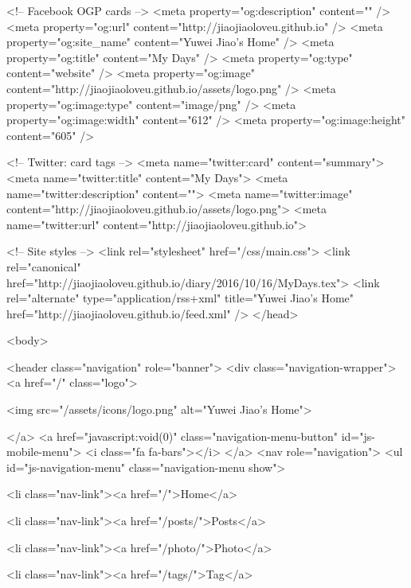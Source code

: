   
  <!-- Facebook OGP cards -->
  <meta property="og:description" content="" />
  <meta property="og:url" content="http://jiaojiaoloveu.github.io" />
  <meta property="og:site_name" content="Yuwei Jiao's Home" />
  <meta property="og:title" content="My Days" />
  <meta property="og:type" content="website" />
  <meta property="og:image" content="http://jiaojiaoloveu.github.io/assets/logo.png" />
  <meta property="og:image:type" content="image/png" />
  <meta property="og:image:width" content="612" />
  <meta property="og:image:height" content="605" />
  

  
  <!-- Twitter: card tags -->
  <meta name="twitter:card" content="summary">
  <meta name="twitter:title" content="My Days">
  <meta name="twitter:description" content="">
  <meta name="twitter:image" content="http://jiaojiaoloveu.github.io/assets/logo.png">
  <meta name="twitter:url" content="http://jiaojiaoloveu.github.io">
  

  

  <!-- Site styles -->
  <link rel="stylesheet" href="/css/main.css">
  <link rel="canonical" href="http://jiaojiaoloveu.github.io/diary/2016/10/16/MyDays.tex">
  <link rel="alternate" type="application/rss+xml" title="Yuwei Jiao's Home" href="http://jiaojiaoloveu.github.io/feed.xml" />
</head>


  <body>

    <header class="navigation" role="banner">
  <div class="navigation-wrapper">
    <a href="/" class="logo">
      
      <img src="/assets/icons/logo.png" alt="Yuwei Jiao's Home">
      
    </a>
    <a href="javascript:void(0)" class="navigation-menu-button" id="js-mobile-menu">
      <i class="fa fa-bars"></i>
    </a>
    <nav role="navigation">
      <ul id="js-navigation-menu" class="navigation-menu show">
        
          
          <li class="nav-link"><a href="/">Home</a>
          
        
          
          <li class="nav-link"><a href="/posts/">Posts</a>
          
        
          
          <li class="nav-link"><a href="/photo/">Photo</a>
          
        
          
          <li class="nav-link"><a href="/tags/">Tag</a>
          
